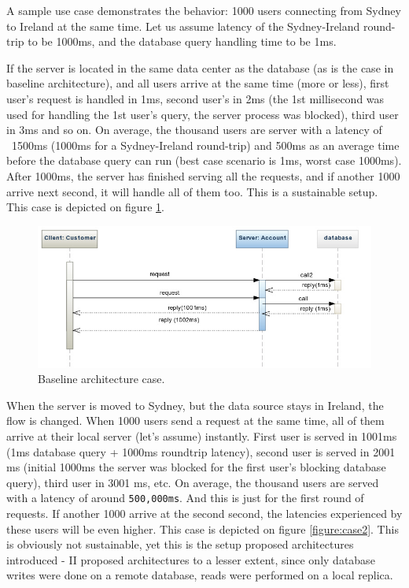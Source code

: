 \documentclass{uvamscse}
\begin{document}
A sample use case demonstrates the behavior: 1000 users connecting from Sydney to Ireland at the same time. Let us assume latency of the Sydney-Ireland round-trip to be 1000ms, and the database query handling time to be 1ms.

If the server is located in the same data center as the database (as is the case in baseline architecture), and all users arrive at the same time (more or less), first user's request is handled in 1ms, second user's in 2ms (the 1st millisecond was used for handling the 1st user's query, the server process was blocked), third user in 3ms and so on. On average, the thousand users are server with a latency of ~1500ms (1000ms for a Sydney-Ireland round-trip) and 500ms as an average time before the database query can run (best case scenario is 1ms, worst case 1000ms). After 1000ms, the server has finished serving all the requests, and if another 1000 arrive next second, it will handle all of them too. This is a sustainable setup. This case is depicted on figure \ref{figure:case1}.

\begin{figure}[H]
\centering
\includegraphics[scale=0.5]{case1}
\caption{Baseline architecture case.}
\label{figure:case1}
\end{figure}

When the server is moved to Sydney, but the data source stays in Ireland, the flow is changed. When 1000 users send a request at the same time, all of them arrive at their local server (let's assume) instantly. First user is served in 1001ms (1ms database query + 1000ms roundtrip latency), second user is served in 2001 ms (initial 1000ms the server was blocked for the first user's blocking database query), third user in 3001 ms, etc. On average, the thousand users are served with a latency of around \texttt{500,000ms}. And this is just for the first round of requests. If another 1000 arrive at the second second, the latencies experienced by these users will be even higher. This case is depicted on figure \ref{figure:case2}. This is obviously not sustainable, yet this is the setup proposed architectures introduced - II proposed architectures to a lesser extent, since only database writes were done on a remote database, reads were performed on a local replica.
\end{document}

